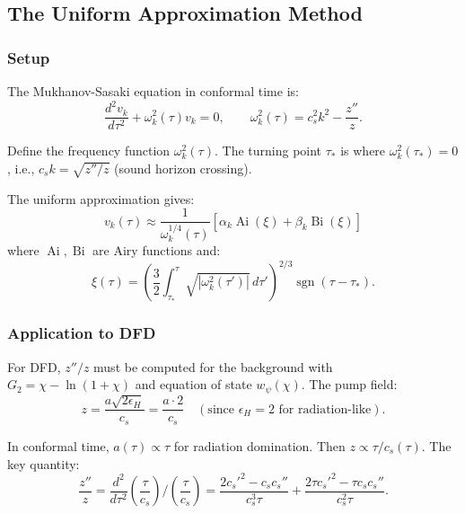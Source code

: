 \documentclass[11pt,a4paper]{article}
\begin{document}
\subsection{The Uniform Approximation Method}

\subsubsection{Setup}

The Mukhanov-Sasaki equation in conformal time is:
\begin{equation}
\frac{d^2 v_k}{d\tau^2} + \omega_k^2(\tau) v_k = 0, \qquad \omega_k^2(\tau) = c_s^2 k^2 - \frac{z''}{z}.
\end{equation}

Define the frequency function $\omega_k^2(\tau)$. The turning point $\tau_*$ is where $\omega_k^2(\tau_*) = 0$, i.e., $c_s k = \sqrt{z''/z}$ (sound horizon crossing).

The uniform approximation gives:
\begin{equation}
v_k(\tau) \approx \frac{1}{\omega_k^{1/4}(\tau)}\left[\alpha_k \operatorname{Ai}(\xi) + \beta_k \operatorname{Bi}(\xi)\right]
\end{equation}
where $\operatorname{Ai}, \operatorname{Bi}$ are Airy functions and:
\begin{equation}
\xi(\tau) = \left(\frac{3}{2}\int_{\tau_*}^{\tau}\sqrt{|\omega_k^2(\tau')|}\,d\tau'\right)^{2/3}\operatorname{sgn}(\tau - \tau_*).
\end{equation}

\subsubsection{Application to DFD}

For DFD, $z''/z$ must be computed for the background with $G_2 = \chi - \ln(1+\chi)$ and equation of state $w_\psi(\chi)$. The pump field:
\begin{equation}
z = \frac{a\sqrt{2\epsilon_H}}{c_s} = \frac{a\cdot 2}{c_s} \quad (\text{since } \epsilon_H = 2 \text{ for radiation-like}).
\end{equation}

In conformal time, $a(\tau) \propto \tau$ for radiation domination. Then $z \propto \tau/c_s(\tau)$. The key quantity:
\begin{equation}
\frac{z''}{z} = \frac{d^2}{d\tau^2}\left(\frac{\tau}{c_s}\right)\bigg/\left(\frac{\tau}{c_s}\right) = \frac{2c_s'^2 - c_s c_s''}{c_s^3\tau} + \frac{2\tau c_s'^2 - \tau c_s c_s''}{c_s^2\tau}.
\end{equation}
\end{document}
